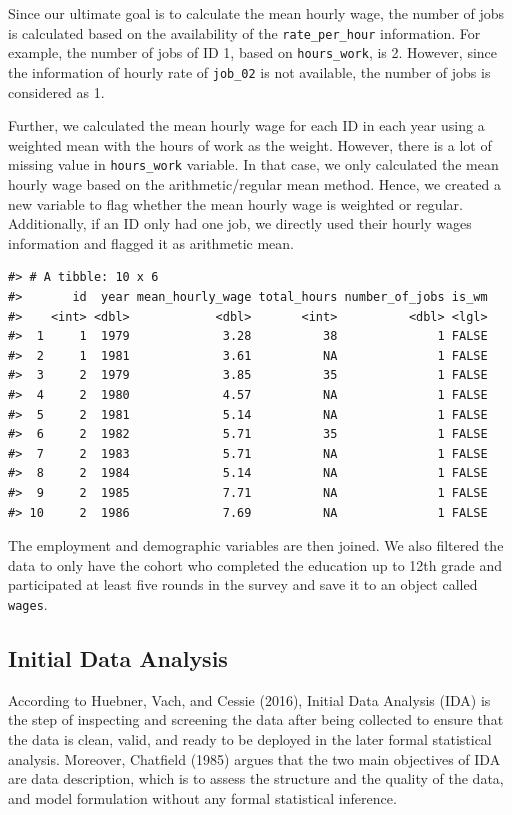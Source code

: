\documentclass{article}
\begin{document}
Since our ultimate goal is to calculate the mean hourly wage, the number of jobs is calculated based on the availability of the \texttt{rate\_per\_hour} information. For example, the number of jobs of ID 1, based on \texttt{hours\_work}, is 2. However, since the information of hourly rate of \texttt{job\_02} is not available, the number of jobs is considered as 1.

Further, we calculated the mean hourly wage for each ID in each year using a weighted mean with the hours of work as the weight. However, there is a lot of missing value in \texttt{hours\_work} variable. In that case, we only calculated the mean hourly wage based on the arithmetic/regular mean method. Hence, we created a new variable to flag whether the mean hourly wage is weighted or regular. Additionally, if an ID only had one job, we directly used their hourly wages information and flagged it as arithmetic mean.

\begin{verbatim}
#> # A tibble: 10 x 6
#>       id  year mean_hourly_wage total_hours number_of_jobs is_wm
#>    <int> <dbl>            <dbl>       <int>          <dbl> <lgl>
#>  1     1  1979             3.28          38              1 FALSE
#>  2     1  1981             3.61          NA              1 FALSE
#>  3     2  1979             3.85          35              1 FALSE
#>  4     2  1980             4.57          NA              1 FALSE
#>  5     2  1981             5.14          NA              1 FALSE
#>  6     2  1982             5.71          35              1 FALSE
#>  7     2  1983             5.71          NA              1 FALSE
#>  8     2  1984             5.14          NA              1 FALSE
#>  9     2  1985             7.71          NA              1 FALSE
#> 10     2  1986             7.69          NA              1 FALSE
\end{verbatim}

The employment and demographic variables are then joined. We also filtered the data to only have the cohort who completed the education up to 12th grade and participated at least five rounds in the survey and save it to an object called \texttt{wages}.

\hypertarget{initial-data-analysis}{%
\subsection{Initial Data Analysis}\label{initial-data-analysis}}

According to Huebner, Vach, and Cessie (2016), Initial Data Analysis (IDA) is the step of inspecting and screening the data after being collected to ensure that the data is clean, valid, and ready to be deployed in the later formal statistical analysis. Moreover, Chatfield (1985) argues that the two main objectives of IDA are data description, which is to assess the structure and the quality of the data, and model formulation without any formal statistical inference.
\end{document}
